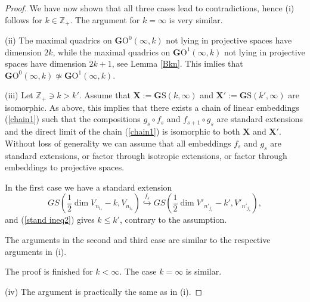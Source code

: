 \documentclass[12pt]{amsart}
\theoremstyle{definition}
\begin{document}
\begin{proof}
We have now shown that all three cases lead to contradictions, hence (i) follows for $k\in\mathbb{Z}_{+}$.
The argument for $k=\infty$ is very similar.

(ii) The maximal quadrics on $\mathbf{G}\mathrm{O}^0(\infty,k)$ not lying in projective spaces have dimension $2k$,
while the maximal quadrics on $\mathbf{G}\mathrm{O}^1(\infty,k)$ not lying in projective spaces have dimension $2k+1$, see Lemma \ref{Bkn}.
This imlies that $\mathbf{G}\mathrm{O}^0(\infty,k)\not\simeq\mathbf{G}\mathrm{O}^1(\infty,k)$.

(iii) Let $\mathbb{Z}_{+}\ni k>k'$. Assume that $\mathbf{X}:=\mathbf{G}\mathrm{S}(k,\infty)$ and
$\mathbf{X}':=\mathbf{G}\mathrm{S}(k',\infty)$ are
isomorphic. As above, this implies that there exists a chain of linear embeddings (\ref{chain1})
such that the compositions $g_s\circ f_s$ and $f_{s+1}\circ g_s$ are standard extensions and
the direct limit of the chain (\ref{chain1}) is isomorphic to both $\mathbf{X}$ and $\mathbf{X}'$.
Without loss of generality we can assume that all embeddings
$f_s$ and $g_s$ are standard extensions, or factor through isotropic extensions, or factor through embeddings
to projective spaces.

In the first case we have a standard extension
$$
GS(\frac{1}{2}\dim V_{n_{i_s}}-k,V_{n_{i_s}})\overset{f_s}\hookrightarrow GS(\frac{1}{2}\dim V'_{n'_{j_s}}-
k',V'_{n'_{j_s}}),
$$
and (\ref{stand ineq2}) gives $k\le k'$, contrary to the assumption.

The arguments in the second and third case are similar to the respective arguments in (i).

The proof is finished for $k<\infty$. The case $k=\infty$ is similar.

(iv) The argument is practically the same as in (i).

\end{proof}
\end{document}
